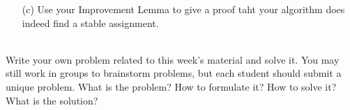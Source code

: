 \documentclass[11pt]{article}
\begin{document}
\begin{qunlist}
\begin{itemize}
\item[(c)] Use your Improvement Lemma to give a proof taht your algorithm does indeed find a stable assignment.

\end{itemize}











 \\

Write your own problem related to this week's material and solve it. You may still work in groups to brainstorm problems, but each student should submit a unique problem. What is the problem? How to formulate it? How to
solve it? What is the solution?


\end{qunlist}
\end{document}
